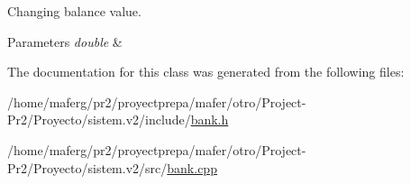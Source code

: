 Changing balance value. 


\begin{DoxyParams}{Parameters}
{\em double} & \\
\hline
\end{DoxyParams}


The documentation for this class was generated from the following files\+:\begin{DoxyCompactItemize}
\item 
/home/maferg/pr2/proyectprepa/mafer/otro/\+Project-\/\+Pr2/\+Proyecto/sistem.\+v2/include/\hyperlink{bank_8h}{bank.\+h}\item 
/home/maferg/pr2/proyectprepa/mafer/otro/\+Project-\/\+Pr2/\+Proyecto/sistem.\+v2/src/\hyperlink{bank_8cpp}{bank.\+cpp}\end{DoxyCompactItemize}
